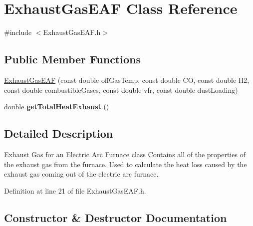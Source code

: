 \hypertarget{class_exhaust_gas_e_a_f}{}\section{Exhaust\+Gas\+E\+AF Class Reference}
\label{class_exhaust_gas_e_a_f}


{\ttfamily \#include $<$Exhaust\+Gas\+E\+A\+F.\+h$>$}

\subsection*{Public Member Functions}
\begin{DoxyCompactItemize}
\item 
\hyperlink{class_exhaust_gas_e_a_f_a500eba1e0016803cb94485594354f36a}{Exhaust\+Gas\+E\+AF} (const double off\+Gas\+Temp, const double CO, const double H2, const double combustible\+Gases, const double vfr, const double dust\+Loading)
\item 
\mbox{\label{class_exhaust_gas_e_a_f_a5f6442dab618e142b4ce43fcfb11d0cb}} 
double {\bfseries get\+Total\+Heat\+Exhaust} ()
\end{DoxyCompactItemize}


\subsection{Detailed Description}
Exhaust Gas for an Electric Arc Furnace class Contains all of the properties of the exhaust gas from the furnace. Used to calculate the heat loss caused by the exhaust gas coming out of the electric arc furnace. 

Definition at line 21 of file Exhaust\+Gas\+E\+A\+F.\+h.



\subsection{Constructor \& Destructor Documentation}
\mbox{\label{class_exhaust_gas_e_a_f_a500eba1e0016803cb94485594354f36a}} 
